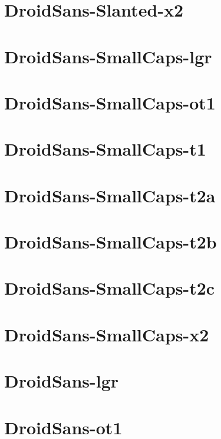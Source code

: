 \documentclass{article}
\begin{document}
\section{DroidSans-Slanted-x2}

\section{DroidSans-SmallCaps-lgr}

\section{DroidSans-SmallCaps-ot1}

\section{DroidSans-SmallCaps-t1}

\section{DroidSans-SmallCaps-t2a}

\section{DroidSans-SmallCaps-t2b}

\section{DroidSans-SmallCaps-t2c}

\section{DroidSans-SmallCaps-x2}

\section{DroidSans-lgr}

\section{DroidSans-ot1}
\end{document}
